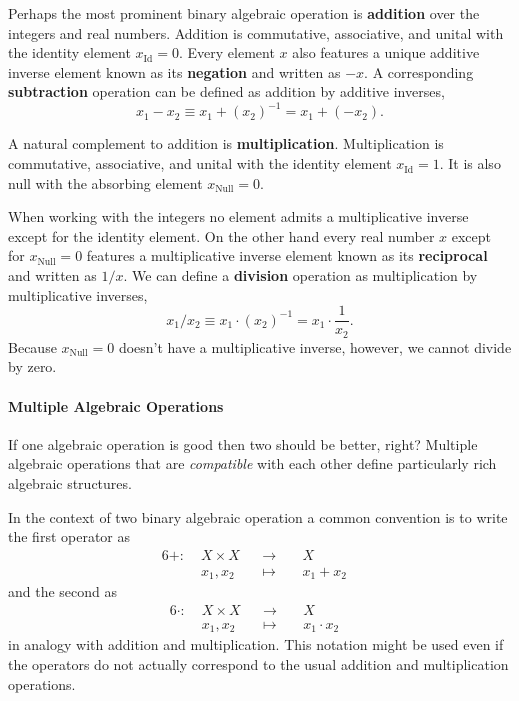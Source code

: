 \documentclass[
  letterpaper,
  DIV=11,
  numbers=noendperiod]{scrartcl}
\let\oldparagraph\paragraph
\renewcommand{\paragraph}[1]{\oldparagraph{#1}\mbox{}}
\begin{document}
Perhaps the most prominent binary algebraic operation is
\textbf{addition} over the integers and real numbers. Addition is
commutative, associative, and unital with the identity element
\(x_{\text{Id}} = 0\). Every element \(x\) also features a unique
additive inverse element known as its \textbf{negation} and written as
\(-x\). A corresponding \textbf{subtraction} operation can be defined as
addition by additive inverses, \[
x_{1} - x_{2} \equiv x_{1} + (x_{2})^{-1} = x_{1} + (-x_{2}).
\]

A natural complement to addition is \textbf{multiplication}.
Multiplication is commutative, associative, and unital with the identity
element \(x_{\text{Id}} = 1\). It is also null with the absorbing
element \(x_{\text{Null}} = 0\).

When working with the integers no element admits a multiplicative
inverse except for the identity element. On the other hand every real
number \(x\) except for \(x_{\text{Null}} = 0\) features a
multiplicative inverse element known as its \textbf{reciprocal} and
written as \(1 /x\). We can define a \textbf{division} operation as
multiplication by multiplicative inverses, \[
x_{1} / x_{2} \equiv x_{1} \cdot (x_{2})^{-1} = x_{1} \cdot \frac{1}{x_{2}}.
\] Because \(x_{\text{Null}} = 0\) doesn't have a multiplicative
inverse, however, we cannot divide by zero.

\hypertarget{multiple-algebraic-operations}{%
\paragraph{Multiple Algebraic
Operations}\label{multiple-algebraic-operations}}

If one algebraic operation is good then two should be better, right?
Multiple algebraic operations that are \emph{compatible} with each other
define particularly rich algebraic structures.

In the context of two binary algebraic operation a common convention is
to write the first operator as \begin{alignat*}{6}
+ :\; & X \times X& &\rightarrow& \; & X &
\\
& x_{1}, x_{2} & &\mapsto& & x_{1} + x_{2} &
\end{alignat*} and the second as \begin{alignat*}{6}
\cdot :\; & X \times X& &\rightarrow& \; & X &
\\
& x_{1}, x_{2} & &\mapsto& & x_{1} \cdot x_{2} &
\end{alignat*} in analogy with addition and multiplication. This
notation might be used even if the operators do not actually correspond
to the usual addition and multiplication operations.
\end{document}
